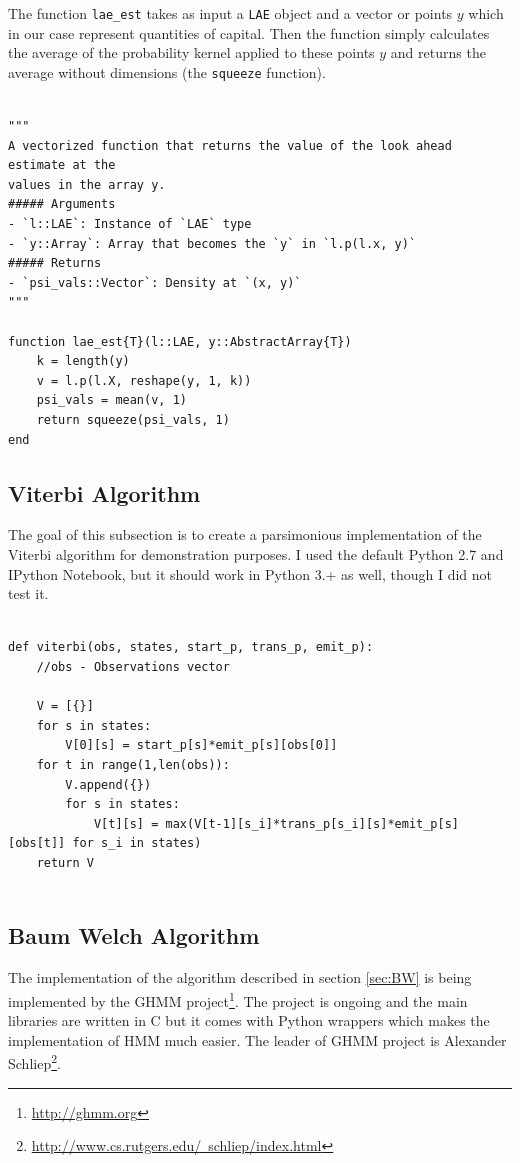 \documentclass[a4paper,12pt]{article}
\theoremstyle{definition}
\begin{document}
The function \texttt{lae\_est} takes as input a \texttt{LAE} object and a vector or points $y$ which in our case represent quantities of capital. Then the function simply calculates the average of the probability kernel applied to these points $y$ and returns the average without dimensions (the \texttt{squeeze} function). 

\begin{lstlisting}

"""
A vectorized function that returns the value of the look ahead estimate at the
values in the array y.
##### Arguments
- `l::LAE`: Instance of `LAE` type
- `y::Array`: Array that becomes the `y` in `l.p(l.x, y)`
##### Returns
- `psi_vals::Vector`: Density at `(x, y)`
"""

function lae_est{T}(l::LAE, y::AbstractArray{T})
    k = length(y)
    v = l.p(l.X, reshape(y, 1, k))
    psi_vals = mean(v, 1)
    return squeeze(psi_vals, 1)
end
\end{lstlisting}


\subsection{Viterbi Algorithm}
The goal of this subsection is to create a parsimonious implementation of the Viterbi algorithm for demonstration purposes. I used the default Python 2.7 and IPython Notebook, but it should work in Python 3.+ as well, though I did not test it. 

\begin{lstlisting}

def viterbi(obs, states, start_p, trans_p, emit_p):
	//obs - Observations vector
	
    V = [{}]
    for s in states:
        V[0][s] = start_p[s]*emit_p[s][obs[0]]
    for t in range(1,len(obs)):
        V.append({})
        for s in states:
            V[t][s] = max(V[t-1][s_i]*trans_p[s_i][s]*emit_p[s][obs[t]] for s_i in states)
    return V
    
\end{lstlisting}

\subsection{Baum Welch Algorithm}
The implementation of the algorithm described in section \ref{sec:BW} is being implemented by the GHMM project\footnote{\href{http://ghmm.org}{http://ghmm.org}}. The project is ongoing and the main libraries are written in C but it comes with Python wrappers which makes the implementation of HMM much easier. The leader of GHMM project is Alexander Schliep\footnote{\href{http://www.cs.rutgers.edu/~schliep/index.html}{http://www.cs.rutgers.edu/~schliep/index.html}}.
\end{document}
